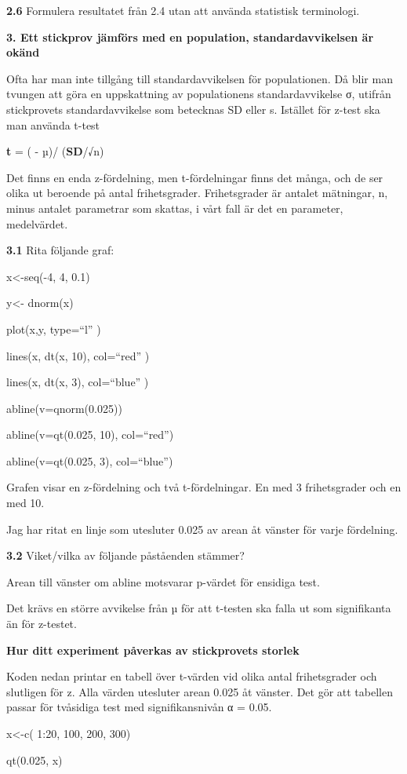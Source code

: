 \documentclass[
  letterpaper,
  DIV=11,
  numbers=noendperiod]{scrartcl}
\begin{document}
\textbf{2.6} Formulera resultatet från 2.4 utan att använda statistisk
terminologi.

\textbf{3. Ett stickprov jämförs med en population, standardavvikelsen
är okänd}

Ofta har man inte tillgång till standardavvikelsen för populationen. Då
blir man tvungen att göra en uppskattning av populationens
standardavvikelse σ, utifrån stickprovets standardavvikelse som
betecknas SD eller s. Istället för z-test ska man använda t-test

\textbf{t} = ( - µ)/ (\textbf{SD}/√n)

Det finns en enda z-fördelning, men t-fördelningar finns det många, och
de ser olika ut beroende på antal frihetsgrader. Frihetsgrader är
antalet mätningar, n, minus antalet parametrar som skattas, i vårt fall
är det en parameter, medelvärdet.

\textbf{3.1} Rita följande graf:

x\textless-seq(-4, 4, 0.1)

y\textless- dnorm(x)

plot(x,y, type=``l'' )

lines(x, dt(x, 10), col=``red'' )

lines(x, dt(x, 3), col=``blue'' )

abline(v=qnorm(0.025))

abline(v=qt(0.025, 10), col=``red'')

abline(v=qt(0.025, 3), col=``blue'')

Grafen visar en z-fördelning och två t-fördelningar. En med 3
frihetsgrader och en med 10.

Jag har ritat en linje som utesluter 0.025 av arean åt vänster för varje
fördelning.

\textbf{3.2} Viket/vilka av följande påståenden stämmer?

Arean till vänster om abline motsvarar p-värdet för ensidiga test.

Det krävs en större avvikelse från µ för att t-testen ska falla ut som
signifikanta än för z-testet.

\textbf{Hur ditt experiment påverkas av stickprovets storlek}

Koden nedan printar en tabell över t-värden vid olika antal
frihetsgrader och slutligen för z. Alla värden utesluter arean 0.025 åt
vänster. Det gör att tabellen passar för tvåsidiga test med
signifikansnivån α = 0.05.

x\textless-c( 1:20, 100, 200, 300)

qt(0.025, x)
\end{document}

